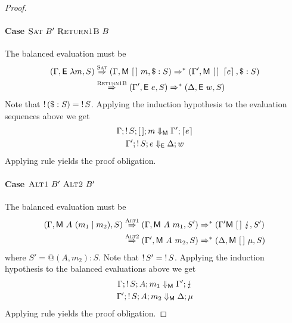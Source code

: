 \begin{proof}
  \paragraph{Case $\textsc{Sat}~B'~\textsc{Return1B}~B$}
  The balanced evaluation must be
  \[
    \begin{split}
      (\Gamma, \textsf{E}~\lambda m, S) & \stackrel{\textsc{Sat}}{\Rightarrow}
      (\Gamma, \textsf{M}~[\,]~m, \$:S) \Rightarrow^{*}
      (\Gamma', \textsf{M}~[\,]~\left\lceil e\right\rceil, \$:S) \\
      & \stackrel{\textsc{Return1B}}{\Rightarrow}
      (\Gamma', \textsf{E}~e, S) \Rightarrow^{*}
      (\Delta, \textsf{E}~w, S)
    \end{split}
  \]
  Note that $\mathop{!}{(\$:S)} = \mathop{!}{S}$.
  Applying the induction hypothesis to the evaluation sequences above we get
  \begin{gather*}
    \Gamma;\mathop{!}{S}; [\,]; m \Downarrow_{\textsf{M}} \Gamma'; \left\lceil e\right\rceil \\
    \Gamma';\mathop{!}{S}; e \Downarrow_{\textsf{E}} \Delta; w
  \end{gather*}
  Applying rule  yields the proof obligation.

  \paragraph{Case $\textsc{Alt1}~B'~\textsc{Alt2}~B'$}
  The balanced evaluation must be
  \[ \begin{split}
      (\Gamma, \textsf{M}~A~(m_1 \mid m_2), S) &
      \stackrel{\textsc{Alt1}}{\Rightarrow}
      (\Gamma, \textsf{M}~A~m_1, S') \Rightarrow^{*}
      (\Gamma' \textsf{M}~[\,]~\lightning, S') \\
      & \stackrel{\textsc{Alt2}}{\Rightarrow}
    (\Gamma', \textsf{M}~A~m_2, S) \Rightarrow^{*}
    (\Delta, \textsf{M}~[\,]~\mu, S)
      \end{split}
  \]
  where $S' = @(A,m_2):S$.  Note that $\mathop{!}{S'} = \mathop{!}{S}$. Applying
  the induction hypothesis to the balanced evaluations above we get
  \begin{gather*}
    \Gamma;\mathop{!}{S};A;m_1 \Downarrow_{\textsf{M}} \Gamma'; \lightning \\
    \Gamma';\mathop{!}{S};A;m_2 \Downarrow_{\textsf{M}} \Delta; \mu
  \end{gather*}
  Applying rule  yields the proof obligation.
\end{proof}


